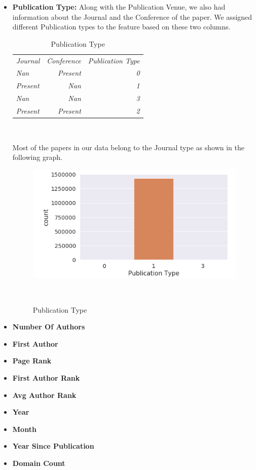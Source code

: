 \documentclass[a4paper, 11pt]{article}
\begin{document}
\begin{itemize}
    \item \textbf{Publication Type:} Along with the Publication Venue, we also had information about the Journal and the Conference of the paper. We assigned different Publication types to the feature based on these two columns.
    \begin{table}[h]
  \centering
  \begin{tabular}{l | r | r}
    {\small \textit{Journal}}& {\small \textit{Conference}} & {\small \textit{Publication Type}}\\
    {\small \textit{Nan}} & {\small \textit{Present}} & {\small \textit{0}}\\
    {\small \textit{Present}} & {\small \textit{Nan}} & {\small \textit{1}}\\
    {\small \textit{Nan}} & {\small \textit{Nan}} & {\small \textit{3}}\\
    {\small \textit{Present}} & {\small \textit{Present}} & {\small \textit{2}}\\
  \end{tabular}
  \caption{Publication Type}~\label{tab:table1}
\end{table}
Most of the papers in our data belong to the Journal type as shown in the following graph.
\begin{figure}[ht]
  \includegraphics[width=0.6\columnwidth]{PublicationType.png}
  \caption{Publication Type}~\label{fig:Reach}
\end{figure}
\FloatBarrier
    \item \textbf{Number Of Authors}
    \item \textbf{First Author}
    \item \textbf{Page Rank}
    \item \textbf{First Author Rank}
    \item \textbf{Avg Author Rank}
    \item \textbf{Year}
    \item \textbf{Month}
    \item \textbf{Year Since Publication}
    \item \textbf{Domain Count}
\end{itemize}
\end{document}
